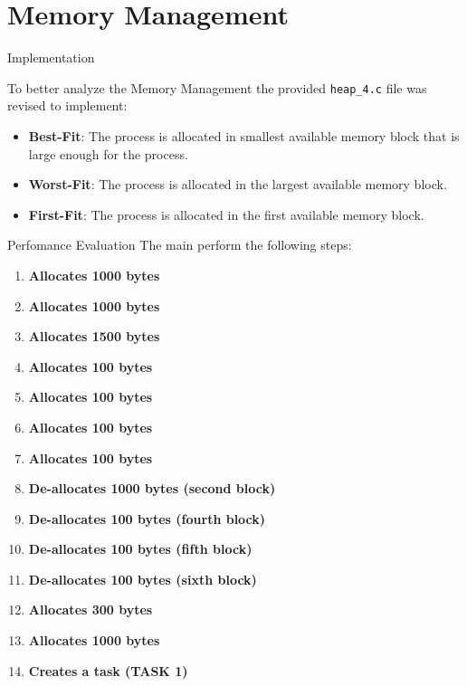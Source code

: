 \documentclass{beamer}
\begin{document}
\section{Memory Management}
\begin{frame}{Implementation}

To better analyze the Memory Management the provided \texttt{heap\_4.c} file was revised to implement:
\begin{itemize}
    \item \textbf{Best-Fit}: The process is allocated in smallest available memory block that is large enough for the process.  
    \item \textbf{Worst-Fit}: The process is allocated in the largest available memory block.
    \item \textbf{First-Fit}: The process is allocated in the first available memory block.
\end{itemize}

    
\end{frame}

\begin{frame}{Perfomance Evaluation}
The main perform the following steps:
\begin{multicols}{2} %
\begin{enumerate}
    \item \textbf{Allocates 1000 bytes}
    \item \textbf{Allocates 1000 bytes}
    \item \textbf{Allocates 1500 bytes}
    \item \textbf{Allocates 100 bytes}
    \item \textbf{Allocates 100 bytes}
    \item \textbf{Allocates 100 bytes}
    \item \textbf{Allocates 100 bytes}
    \item \textbf{De-allocates 1000 bytes (second block)}
    \item \textbf{De-allocates 100 bytes (fourth block)}
    \item \textbf{De-allocates 100 bytes (fifth block)}
    \item \textbf{De-allocates 100 bytes (sixth block)}
    \item \textbf{Allocates 300 bytes}
    \item \textbf{Allocates 1000 bytes}
    \item \textbf{Creates a task (TASK 1)}
\end{enumerate}
\end{multicols}
\end{frame}
\end{document}
